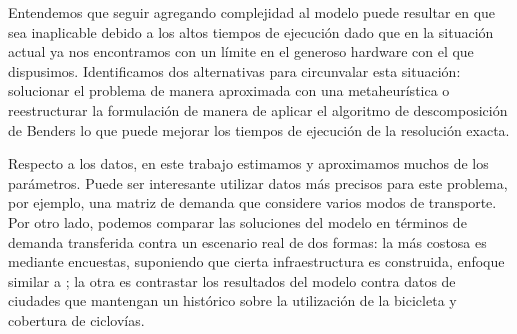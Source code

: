 Entendemos que seguir agregando complejidad al modelo puede resultar en que sea inaplicable debido a los altos tiempos de ejecución dado que en la situación actual ya nos encontramos con un límite en el generoso hardware con el que dispusimos. Identificamos dos alternativas para circunvalar esta situación: solucionar el problema de manera aproximada con una metaheurística o reestructurar la formulación de manera de aplicar el algoritmo de descomposición de Benders \parencite{bucarey2022, crainic2021} lo que puede mejorar los tiempos de ejecución de la resolución exacta.

Respecto a los datos, en este trabajo estimamos y aproximamos muchos de los parámetros. Puede ser interesante utilizar datos más precisos para este problema, por ejemplo, una matriz de demanda que considere varios modos de transporte. Por otro lado, podemos comparar las soluciones del modelo en términos de demanda transferida contra un escenario real de dos formas: la más costosa es mediante encuestas, suponiendo que cierta infraestructura es construida, enfoque similar a \textcite{shwe2014}; la otra es contrastar los resultados del modelo contra datos de ciudades que mantengan un histórico sobre la utilización de la bicicleta y cobertura de ciclovías.
